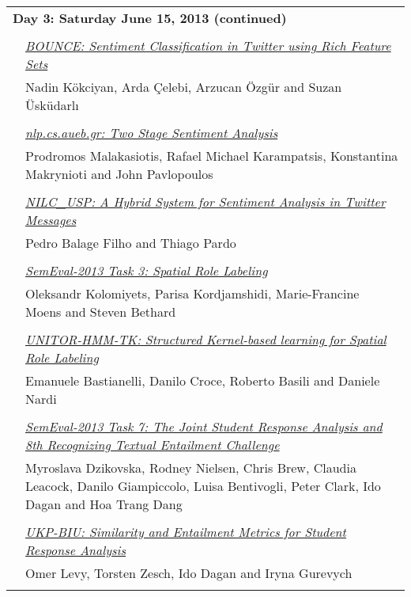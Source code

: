 \begin{tabular}{p{20mm}p{138mm}}
\\
\multicolumn{2}{l}{\bf Day 3: Saturday June 15, 2013 (continued)} \\\\

 & \hyperlink{page.554}{\em BOUNCE: Sentiment Classification in Twitter using Rich Feature Sets}\\
         & Nadin K\"{o}kciyan, Arda \c{C}elebi, Arzucan \"{O}zg\"{u}r and Suzan \"{U}sk\"{u}darlı \\
\\

 & \hyperlink{page.562}{\em nlp.cs.aueb.gr: Two Stage Sentiment Analysis}\\
         & Prodromos Malakasiotis, Rafael Michael Karampatsis, Konstantina Makrynioti and John Pavlopoulos \\
\\

 & \hyperlink{page.568}{\em NILC\_USP: A Hybrid System for Sentiment Analysis in Twitter Messages}\\
         & Pedro Balage Filho and Thiago Pardo \\
\\

& \hyperlink{page.255}{\em SemEval-2013 Task 3: Spatial Role Labeling}\\
         & Oleksandr Kolomiyets, Parisa Kordjamshidi, Marie-Francine Moens and Steven Bethard \\
\\


 & \hyperlink{page.573}{\em UNITOR-HMM-TK: Structured Kernel-based learning for Spatial Role Labeling}\\
         & Emanuele Bastianelli, Danilo Croce, Roberto Basili and Daniele Nardi \\
\\


& \hyperlink{page.263}{\em SemEval-2013 Task 7: The Joint Student Response Analysis and 8th Recognizing Textual Entailment Challenge}\\
         & Myroslava Dzikovska, Rodney Nielsen, Chris Brew, Claudia Leacock, Danilo Giampiccolo, Luisa Bentivogli, Peter Clark, Ido Dagan and Hoa Trang Dang \\
\\


& \hyperlink{page.285}{\em UKP-BIU: Similarity and Entailment Metrics for Student Response Analysis}\\
         & Omer Levy, Torsten Zesch, Ido Dagan and Iryna Gurevych \\
\\



\end{tabular}
